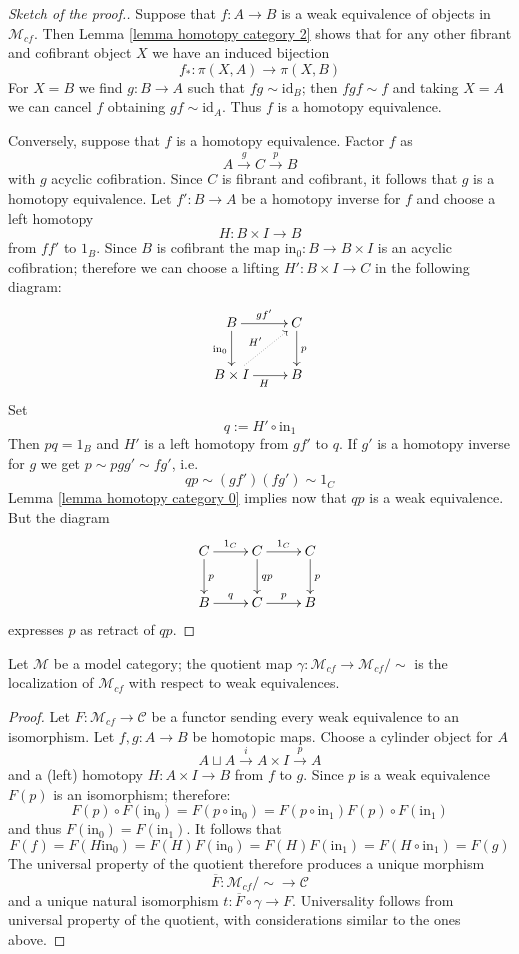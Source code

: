 \begin{proof}[Sketch of the proof.]
Suppose that $f \colon A \to B$ is a weak equivalence of objects in $\mathcal M_{cf}$. Then Lemma \ref{lemma homotopy category 2} shows that for any other fibrant and cofibrant object $X$ we have an induced bijection
\[
f_* \colon \pi(X,A) \to \pi(X,B)
\]
For $X = B$ we find $g \colon B \to A$ such that $fg \sim \mathrm{id}_B$; then $fgf \sim f$ and taking $X = A$ we can cancel $f$ obtaining $gf \sim \mathrm{id}_A$. Thus $f$ is a homotopy equivalence.

Conversely, suppose that $f$ is a homotopy equivalence. Factor $f$ as
\[
A \xrightarrow{g} C \xrightarrow{p} B
\]
with $g$ acyclic cofibration. Since $C$ is fibrant and cofibrant, it follows that $g$ is a homotopy equivalence. Let $f' \colon B \to A$ be a homotopy inverse for $f$ and choose a left homotopy
\[
H \colon B \times I \to B
\]
from $ff'$ to $1_B$. Since $B$ is cofibrant the map $\mathrm{in}_0 \colon B \to B \times I$ is an acyclic cofibration; therefore we can choose a lifting $H' \colon B \times I \to C$ in the following diagram:
\[
\xymatrix{
B \ar[d]_{\mathrm{in}_0} \ar[r]^{gf'} & C \ar[d]^p \\ B \times I \ar@{.>}[ur]^{H'} \ar[r]_H & B
}
\]
Set
\[
q := H' \circ \mathrm{in}_1
\]
Then $pq = 1_B$ and $H'$ is a left homotopy from $gf'$ to $q$. If $g'$ is a homotopy inverse for $g$ we get $p \sim pgg' \sim fg'$, i.e.
\[
qp \sim (gf') (fg') \sim 1_C
\]
Lemma \ref{lemma homotopy category 0} implies now that $qp$ is a weak equivalence. But the diagram
\[
\xymatrix{
C \ar[r]^{1_C} \ar[d]^p & C \ar[r]^{1_C} \ar[d]^{qp} & C \ar[d]^p \\ B \ar[r]^q & C \ar[r]^p & B
}
\]
expresses $p$ as retract of $qp$.
\end{proof}

\begin{cor} \label{cor homotopy for fibrant cofibrant}
Let $\mathcal M$ be a model category; the quotient map $\gamma \colon \mathcal M_{cf} \to \mathcal M_{cf} / \sim$ is the localization of $\mathcal M_{cf}$ with respect to weak equivalences.
\end{cor}

\begin{proof}
Let $F \colon \mathcal M_{cf} \to \mathcal C$ be a functor sending every weak equivalence to an isomorphism. Let $f,g \colon A \to B$ be homotopic maps. Choose a cylinder object for $A$
\[
A \sqcup A \xrightarrow{i} A \times I \xrightarrow{p} A
\]
and a (left) homotopy $H \colon A \times I \to B$ from $f$ to $g$. Since $p$ is a weak equivalence $F(p)$ is an isomorphism; therefore:
\[
F(p) \circ F(\mathrm{in}_0) = F(p \circ \mathrm{in}_0) = F(p \circ \mathrm{in}_1) F(p) \circ F(\mathrm{in}_1)
\]
and thus $F(\mathrm{in}_0) = F(\mathrm{in}_1)$. It follows that
\[
F(f) = F(H \mathrm{in}_0) = F(H) F(\mathrm{in}_0) = F(H) F(\mathrm{in}_1) = F(H \circ \mathrm{in_1}) = F(g)
\]
The universal property of the quotient therefore produces a unique morphism
\[
\overline{F} \colon \mathcal M_{cf} / \sim \to \mathcal C
\]
and a unique natural isomorphism $t \colon \overline{F} \circ \gamma \to F$. Universality follows from universal property of the quotient, with considerations similar to the ones above.
\end{proof}

